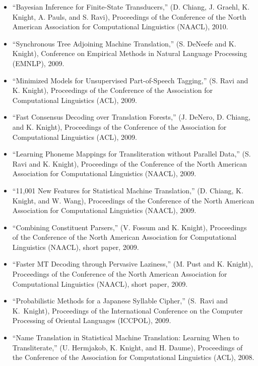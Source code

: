 \begin{itemize}
\item ``Bayesian Inference for Finite-State Transducers,'' 
(D. Chiang, J. Graehl, K. Knight, A. Pauls, and S. Ravi),
Proceedings of the Conference of the 
North American Association for Computational Linguistics (NAACL), 
2010.


\item ``Synchronous Tree Adjoining Machine Translation,''
(S. DeNeefe and K. Knight), 
Conference on Empirical Methods in Natural Language Processing (EMNLP), 
2009.

\item ``Minimized Models for Unsupervised Part-of-Speech Tagging,''
(S. Ravi and K. Knight), 
Proceedings of the Conference of the 
Association for Computational Linguistics (ACL), 
2009.

\item ``Fast Consensus Decoding over Translation Forests,''
(J. DeNero, D. Chiang, and K. Knight), 
Proceedings of the Conference of the 
Association for Computational Linguistics (ACL), 
2009.

\item ``Learning Phoneme Mappings for Transliteration without Parallel Data,''
(S. Ravi and K. Knight), 
Proceedings of the Conference of the 
North American Association for Computational Linguistics (NAACL), 
2009.

\item ``11,001 New Features for Statistical Machine Translation,''
(D. Chiang, K. Knight, and W. Wang), 
Proceedings of the Conference of the 
North American Association for Computational Linguistics (NAACL), 
2009.

\item ``Combining Constituent Parsers,''
(V. Fossum and K. Knight), 
Proceedings of the Conference of the 
North American Association for Computational Linguistics (NAACL), 
short paper,
2009.

\item ``Faster MT Decoding through Pervasive Laziness,''
(M. Pust and K. Knight), 
Proceedings of the Conference of the 
North American Association for Computational Linguistics (NAACL), 
short paper,
2009.

\item ``Probabilistic Methods for a Japanese Syllable Cipher,''
(S.~Ravi and K.~Knight), Proceedings of the International 
Conference on the Computer
Processing of Oriental Languages (ICCPOL), 2009.

\item ``Name Translation in Statistical Machine Translation: Learning 
When to Transliterate,'' (U. Hermjakob, K. Knight, and H. Daume), 
Proceedings of the Conference of the 
Association for Computational Linguistics (ACL), 
2008.


\end{itemize}
